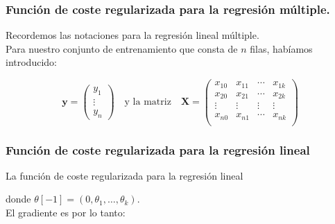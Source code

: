 \documentclass{beamer}
\begin{document}
       \begin{frame}\frametitle{Función de coste regularizada para la regresión múltiple.}
   \begin{overlayarea}{\textwidth}{8cm} 
   Recordemos las notaciones para la regresión lineal múltiple.\\ Para nuestro conjunto de entrenamiento que consta de $n$ filas, habíamos introducido:
  
$$\mathbf{y}=\left(\begin{array}{l}
y_1\\\vdots\\y_n  
\end{array}\right) \quad\mbox{y la matriz}\quad \mathbf{X}=\left(
\begin{array}{llll}
x_{10}&x_{11}&\cdots&x_{1k}\\
x_{20}&x_{21}&\cdots&x_{2k}\\
\vdots&\vdots&\vdots&\vdots\\
  x_{n0}&x_{n1}&\cdots&x_{nk}\\
\end{array}\right)$$ 
   \end{overlayarea}
   
 \end{frame} 
       \begin{frame}\frametitle{Función de coste regularizada para la regresión lineal}
   \begin{overlayarea}{\textwidth}{8cm} 
   La función de coste regularizada para la regresión lineal
      \begin{center}
    \end{center}
      donde $\theta[-1]=(0,\theta_1,\ldots,\theta_k).$\\
       El gradiente es por lo tanto:
      \begin{center}
      \end{center}
   \end{overlayarea}
   
 \end{frame}
\end{document}
